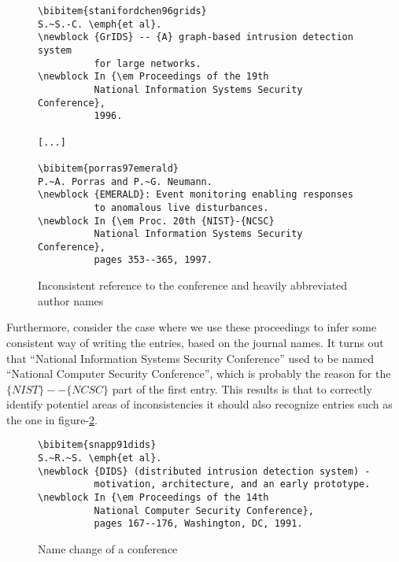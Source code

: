 \begin{figure}[ht]
  \centering
\begin{small}
\begin{verbatim}
\bibitem{stanifordchen96grids}
S.~S.-C. \emph{et al}.
\newblock {GrIDS} -- {A} graph-based intrusion detection system 
          for large networks.
\newblock In {\em Proceedings of the 19th
          National Information Systems Security Conference},
          1996.

[...]

\bibitem{porras97emerald}
P.~A. Porras and P.~G. Neumann.
\newblock {EMERALD}: Event monitoring enabling responses 
          to anomalous live disturbances.
\newblock In {\em Proc. 20th {NIST}-{NCSC}
          National Information Systems Security Conference},
          pages 353--365, 1997.

\end{verbatim}
\end{small}
  \caption{Inconsistent reference to the conference and heavily abbreviated author names}
\label{fig:entry_journal_name_authors}
\end{figure}

Furthermore, consider the case where we use these proceedings to infer
some consistent way of writing the entries, based on the journal
names.  It turns out that ``National Information Systems Security
Conference'' used to be named ``National Computer Security
Conference'', which is probably the reason for the
$\{NIST\}--\{NCSC\}$ part of the first entry.  This results is that to
correctly identify potentiel areas of inconsistencies it should also
recognize entries such as the one in figure-\ref{fig:conference_name}.

\begin{figure}[ht]
  \centering
\begin{small}
\begin{verbatim}
\bibitem{snapp91dids}
S.~R.~S. \emph{et al}.
\newblock {DIDS} (distributed intrusion detection system) -
          motivation, architecture, and an early prototype.
\newblock In {\em Proceedings of the 14th
          National Computer Security Conference},
          pages 167--176, Washington, DC, 1991.
\end{verbatim}
\end{small}
  \caption{Name change of a conference}
\label{fig:conference_name}
\end{figure}


